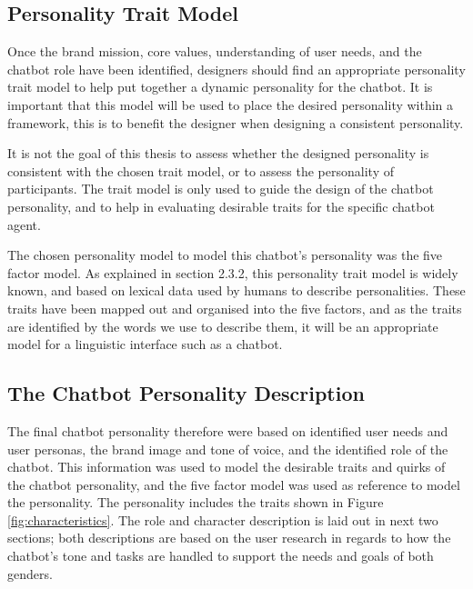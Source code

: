 \vspace{5mm}

    \subsection{Personality Trait Model}
    Once the brand mission, core values, understanding of user needs, and the chatbot role have been identified, designers should find an appropriate personality trait model to help put together a dynamic personality for the chatbot. It is important that this model will be used to place the desired personality within a framework, this is to benefit the designer when designing a consistent personality. 
    
    It is not the goal of this thesis to assess whether the designed personality is consistent with the chosen trait model, or to assess the personality of participants. The trait model is only used to guide the design of the chatbot personality, and to help in evaluating desirable traits for the specific chatbot agent. 
    
    The chosen personality model to model this chatbot's personality was the five factor model. As explained in section 2.3.2, this personality trait model is widely known, and based on lexical data used by humans to describe personalities. These traits have been mapped out and organised into the five factors, and as the traits are identified by the words we use to describe them, it will be an appropriate model for a linguistic interface such as a chatbot.
    
\vspace{5mm}

    \subsection{The Chatbot Personality Description}
    The final chatbot personality therefore were based on identified user needs and user personas, the brand image and tone of voice, and the identified role of the chatbot. This information was used to model the desirable traits and quirks of the chatbot personality, and the five factor model was used as reference to model the personality. The personality includes the traits shown in Figure \ref{fig:characteristics}. The role and character description is laid out in next two sections; both descriptions are based on the user research in regards to how the chatbot's tone and tasks are handled to support the needs and goals of both genders.
    
